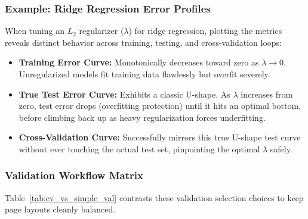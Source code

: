 \documentclass{article}
\begin{document}
\subsubsection{Example: Ridge Regression Error Profiles}
When tuning an $L_2$ regularizer ($\lambda$) for ridge regression, plotting the metrics reveals distinct behavior across training, testing, and cross-validation loops:
\begin{itemize}
    \item \textbf{Training Error Curve:} Monotonically decreases toward zero as $\lambda \to 0$. Unregularized models fit training data flawlessly but overfit severely.
    \item \textbf{True Test Error Curve:} Exhibits a classic U-shape. As $\lambda$ increases from zero, test error drops (overfitting protection) until it hits an optimal bottom, before climbing back up as heavy regularization forces underfitting.
    \item \textbf{Cross-Validation Curve:} Successfully mirrors this true U-shape test curve without ever touching the actual test set, pinpointing the optimal $\lambda$ safely.
\end{itemize}

\subsubsection{Validation Workflow Matrix}
Table~\ref{tab:cv_vs_simple_val} contrasts these validation selection choices to keep page layouts cleanly balanced.

\begin{table}[htbp]
\centering
\small
\renewcommand{\arraystretch}{1.3}
\caption{Comparative Overview of Model Validation Methodologies}
\label{tab:cv_vs_simple_val}
\end{table}
\end{document}

